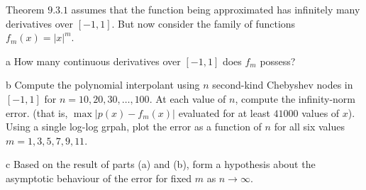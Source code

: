 \begin{statement}{7}
  Theorem $9.3.1$ assumes that the function being approximated has
  infinitely many derivatives over $[-1, 1]$. But now consider the family of functions
  $f_m(x) = |x|^m$.
\end{statement}

\begin{statement}{a}
  How many continuous derivatives over $[-1, 1]$ does $f_m$ possess?
\end{statement}

\begin{statement}{b}
  Compute the polynomial interpolant using $n$ second-kind Chebyshev
  nodes in $[-1, 1]$ for $n = 10, 20, 30, \dots, 100$.
  At each value of $n$, compute the infinity-norm error.
  (that is, $\max|p(x) - f_m(x)|$ evaluated for at least $41000$ values of $x$).
  Using a single log-log grpah, plot the error as a function of $n$ for all six values $m = 1, 3, 5, 7, 9, 11$.
\end{statement}

\begin{statement}{c}
  Based on the result of parts (a) and (b), form a hypothesis about the asymptotic behaviour
  of the error for fixed $m$ as $n \to \infty$.
\end{statement}